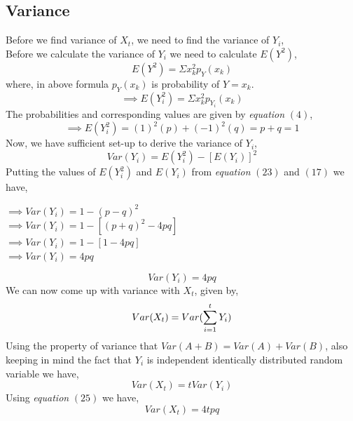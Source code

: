 \documentclass[12pt,a4paper]{article}%
\begin{document}
 	\subsection{Variance}
 	\begin{flushleft}
 		Before we find variance of $X_{t}$, we need to find the variance of $Y_{i}$,\\\smallskip
 		Before we calculate the variance of $Y_{i}$ we need to calculate $E(Y^{2})$,
 		\begin{equation}
 		E(Y^{2})=\Sigma x_{k}^{2}p_{Y}(x_{k})
 		\end{equation}
 		where, in above formula $p_{Y}(x_{k})$ is probability of $Y=x_{k}$.\\\smallskip
 		\begin{equation}
 		\implies E(Y_{i}^{2})=\Sigma x_{k}^{2}p_{Y_{i}}(x_{k})
 		\end{equation}
 		The probabilities and corresponding values are given by \textit{equation} $(4)$,
 		\begin{equation}
 		\implies E(Y_{i}^{2})=(1)^{2}(p)+(-1)^{2}(q)=p+q=1
 		\end{equation}
 		Now, we have sufficient set-up to derive the variance of $Y_{i}$,
 		\begin{equation}
 		Var(Y_{i}) = E(Y_{i}^{2})-[E(Y_{i})]^{2}
 		\end{equation}
 		Putting the values of $E(Y_{i}^{2})$ and $E(Y_{i})$ from \textit{equation} $(23)$ and $(17)$ we have,
 		\begin{center}
 			$\implies Var(Y_{i}) = 1-(p-q)^{2}$\\\smallskip
 			$\implies Var(Y_{i}) = 1-[(p+q)^{2}-4pq]$\\\smallskip
 			$\implies Var(Y_{i}) = 1-[1-4pq]$\\\smallskip
 			$\implies Var(Y_{i}) = 4pq$
 		\end{center}
 		\begin{equation}
 			 \boxed{ Var(Y_{i}) = 4pq }
 		\end{equation}
 		We can now come up with variance with $X_{t}$, given by,
 		\begin{equation}
 			Var(X_{t})=Var(\sum_{\mathclap{i=1}}^{t} Y_{i})
 		\end{equation}
 		Using the property of variance that $Var(A+B) = Var(A) + Var(B)$, also keeping in mind the fact that $Y_{i}$ is independent identically distributed random variable we have,
 		\begin{equation}
 			Var(X_{t})=tVar(Y_{i})
 		\end{equation}
 		Using \textit{equation} $(25)$ we have,
 		\begin{equation}
 			\boxed{Var(X_{t})=4tpq}
 		\end{equation}
 	\end{flushleft}
\end{document}
